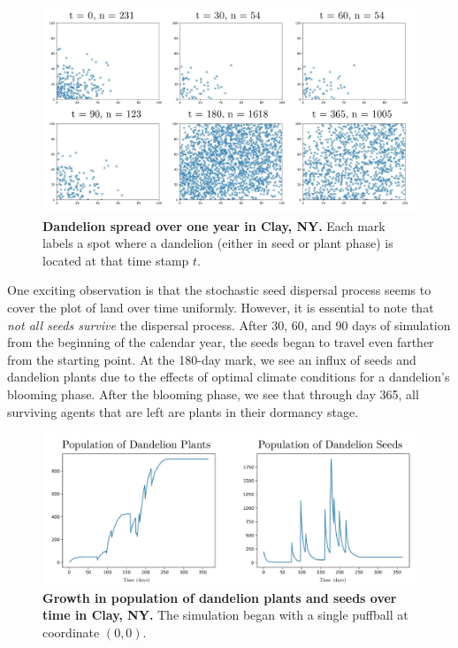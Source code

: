 \begin{figure}[h!]
\centering
    \includegraphics[scale=0.5]{figures/moderateclimatespread.pdf}
    \captionsetup{width=0.9\textwidth}
    \caption{\textbf{Dandelion spread over one year in Clay, NY.} Each mark labels a spot where a dandelion (either in seed or plant phase) is located at that time stamp \(t\).}
    \label{fig:temperatespread}
\end{figure}

One exciting observation is that the stochastic seed dispersal process seems to cover the plot of land over time uniformly. However, it is essential to note that \textit{not all seeds survive} the dispersal process. After 30, 60, and 90 days of simulation from the beginning of the calendar year, the seeds began to travel even farther from the starting point. At the 180-day mark, we see an influx of seeds and dandelion plants due to the effects of optimal climate conditions for a dandelion's blooming phase. After the blooming phase, we see that through day 365, all surviving agents that are left are plants in their dormancy stage.

\begin{figure}[h!]
\centering
    \includegraphics[scale=0.5]{figures/moderateclimatepopulation.pdf}
    \captionsetup{width=0.9\textwidth}
    \caption{\textbf{Growth in population of dandelion plants and seeds over time in Clay, NY.} The simulation began with a single puffball at coordinate \((0, 0)\).}
    \label{fig:temperatepopulation}
\end{figure}

